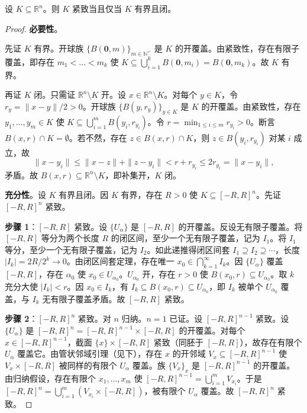 \begin{theorem}\label{thm:heine_borel}
设 $K \subseteq \mathbb{R}^n$。则 $K$ 紧致当且仅当 $K$ 有界且闭。
\end{theorem}

\begin{proof}
\textbf{必要性}。

先证 $K$ 有界。开球族 $\{B(\mathbf{0}, m)\}_{m \in \mathbb{N}^+}$ 是 $K$ 的开覆盖。由紧致性，存在有限子覆盖，即存在 $m_1 < \dots < m_k$ 使 $K \subseteq \bigcup_{i=1}^{k} B(\mathbf{0}, m_i) = B(\mathbf{0}, m_k)$。故 $K$ 有界。

再证 $K$ 闭。只需证 $\mathbb{R}^n \setminus K$ 开。设 $x \in \mathbb{R}^n \setminus K$。对每个 $y \in K$，令 $r_y = \|x - y\| / 2 > 0$。开球族 $\{B(y, r_y)\}_{y \in K}$ 是 $K$ 的开覆盖。由紧致性，存在 $y_1, \dots, y_m \in K$ 使 $K \subseteq \bigcup_{i=1}^{m} B(y_i, r_{y_i})$。令 $r = \min_{1 \le i \le m} r_{y_i} > 0$。断言 $B(x, r) \cap K = \emptyset$。若不然，存在 $z \in B(x, r) \cap K$，则 $z \in B(y_i, r_{y_i})$ 对某 $i$ 成立，故
\[
\|x - y_i\| \le \|x - z\| + \|z - y_i\| < r + r_{y_i} \le 2 r_{y_i} = \|x - y_i\|,
\]
矛盾。故 $B(x, r) \subseteq \mathbb{R}^n \setminus K$，即补集开，$K$ 闭。

\textbf{充分性}。设 $K$ 有界且闭。因 $K$ 有界，存在 $R > 0$ 使 $K \subseteq [-R, R]^n$。先证 $[-R, R]^n$ 紧致。

\textbf{步骤 1}：$[-R, R]$ 紧致。设 $\{U_\alpha\}$ 是 $[-R, R]$ 的开覆盖。反设无有限子覆盖。将 $[-R, R]$ 等分为两个长度 $R$ 的闭区间，至少一个无有限子覆盖，记为 $I_1$。将 $I_1$ 等分，至少一个无有限子覆盖，记为 $I_2$。如此递推得闭区间套 $I_1 \supseteq I_2 \supseteq \cdots$，长度 $|I_k| = 2R / 2^k \to 0$。由闭区间套定理，存在唯一 $x_0 \in \bigcap_{k=1}^{\infty} I_k$。因 $\{U_\alpha\}$ 覆盖 $[-R, R]$，存在 $\alpha_0$ 使 $x_0 \in U_{\alpha_0}$。$U_{\alpha_0}$ 开，存在 $r > 0$ 使 $B(x_0, r) \subseteq U_{\alpha_0}$。取 $k$ 充分大使 $|I_k| < r$。因 $x_0 \in I_k$，有 $I_k \subseteq B(x_0, r) \subseteq U_{\alpha_0}$，即 $I_k$ 被单个 $U_{\alpha_0}$ 覆盖，与 $I_k$ 无有限子覆盖矛盾。故 $[-R, R]$ 紧致。

\textbf{步骤 2}：$[-R, R]^n$ 紧致。对 $n$ 归纳。$n = 1$ 已证。设 $[-R, R]^{n-1}$ 紧致。设 $\{U_\alpha\}$ 是 $[-R, R]^n = [-R, R]^{n-1} \times [-R, R]$ 的开覆盖。对每个 $x \in [-R, R]^{n-1}$，截面 $\{x\} \times [-R, R]$ 紧致（同胚于 $[-R, R]$），故存在有限个 $U_\alpha$ 覆盖它。由管状邻域引理（见下），存在 $x$ 的开邻域 $V_x \subseteq [-R, R]^{n-1}$ 使 $V_x \times [-R, R]$ 被同样的有限个 $U_\alpha$ 覆盖。族 $\{V_x\}_{x}$ 是 $[-R, R]^{n-1}$ 的开覆盖。由归纳假设，存在有限个 $x_1, \dots, x_m$ 使 $[-R, R]^{n-1} = \bigcup_{i=1}^{m} V_{x_i}$。于是 $[-R, R]^n = \bigcup_{i=1}^{m} (V_{x_i} \times [-R, R])$，被有限个 $U_\alpha$ 覆盖。故 $[-R, R]^n$ 紧致。


\end{proof}
